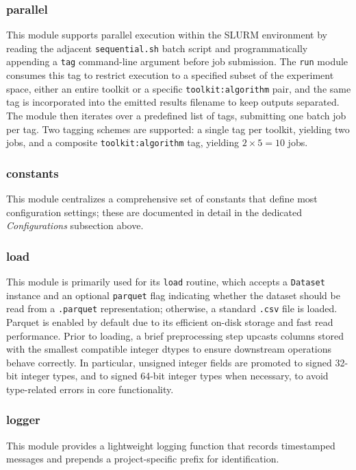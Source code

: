 \documentclass[12pt,a4paper]{article}
\begin{document}
\subsubsection{parallel}
This module supports parallel execution within the SLURM environment by reading the adjacent \texttt{sequential.sh} batch script and programmatically appending a \texttt{tag} command-line argument before job submission. The \texttt{run} module consumes this tag to restrict execution to a specified subset of the experiment space, either an entire toolkit or a specific \texttt{toolkit:algorithm} pair, and the same tag is incorporated into the emitted results filename to keep outputs separated. The module then iterates over a predefined list of tags, submitting one batch job per tag. Two tagging schemes are supported: a single tag per toolkit, yielding two jobs, and a composite \texttt{toolkit:algorithm} tag, yielding $2\times 5 = 10$ jobs.

\subsubsection{constants}
This module centralizes a comprehensive set of constants that define most configuration settings; these are documented in detail in the dedicated \emph{Configurations} subsection above.

\subsubsection{load}
This module is primarily used for its \texttt{load} routine, which accepts a \texttt{Dataset} instance and an optional \texttt{parquet} flag indicating whether the dataset should be read from a \texttt{.parquet} representation; otherwise, a standard \texttt{.csv} file is loaded. Parquet is enabled by default due to its efficient on-disk storage and fast read performance. Prior to loading, a brief preprocessing step upcasts columns stored with the smallest compatible integer dtypes to ensure downstream operations behave correctly. In particular, unsigned integer fields are promoted to signed 32-bit integer types, and to signed 64-bit integer types when necessary, to avoid type-related errors in core functionality.

\subsubsection{logger}
This module provides a lightweight logging function that records timestamped messages and prepends a project-specific prefix for identification.
\end{document}
